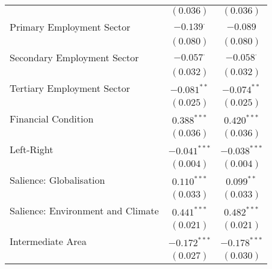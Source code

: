 \begin{center}
\begin{tiny}
\begin{longtable}{l@{} c@{} c@{}}
                                                                            & $(0.036)$        & $(0.036)$        \\
\quad Primary Employment Sector                                             & $-0.139^{\cdot}$ & $-0.089$         \\
                                                                            & $(0.080)$        & $(0.080)$        \\
\quad Secondary Employment Sector                                           & $-0.057^{\cdot}$ & $-0.058^{\cdot}$ \\
                                                                            & $(0.032)$        & $(0.032)$        \\
\quad Tertiary Employment Sector                                            & $-0.081^{**}$    & $-0.074^{**}$    \\
                                                                            & $(0.025)$        & $(0.025)$        \\
\quad Financial Condition                                                   & $0.388^{***}$    & $0.420^{***}$    \\
                                                                            & $(0.036)$        & $(0.036)$        \\
\quad Left-Right                                                            & $-0.041^{***}$   & $-0.038^{***}$   \\
                                                                            & $(0.004)$        & $(0.004)$        \\
\quad Salience: Globalisation                                               & $0.110^{***}$    & $0.099^{**}$     \\
                                                                            & $(0.033)$        & $(0.033)$        \\
\quad Salience: Environment and Climate                                     & $0.441^{***}$    & $0.482^{***}$    \\
                                                                            & $(0.021)$        & $(0.021)$        \\
\quad Intermediate Area                                                     & $-0.172^{***}$   & $-0.178^{***}$   \\
                                                                            & $(0.027)$        & $(0.030)$        \\

\end{longtable}
\end{tiny}
\end{center}
